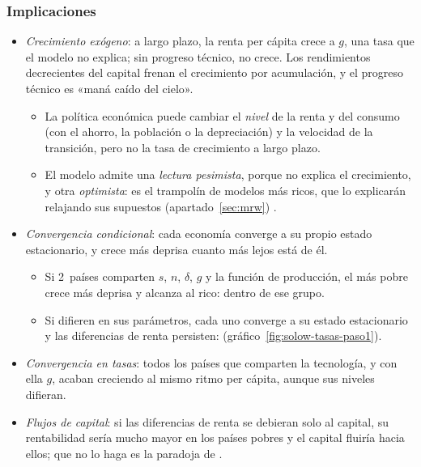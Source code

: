 \documentclass[11pt]{article}
\begin{document}
\subsubsection{Implicaciones}

\begin{itemize}
\item \emph{Crecimiento exógeno}: a largo plazo, la renta per cápita crece a $g$, una tasa que el modelo no explica; sin progreso técnico, no crece. Los rendimientos decrecientes del capital frenan el crecimiento por acumulación, y el progreso técnico es «maná caído del cielo».
  \begin{itemize}
  \item La política económica puede cambiar el \emph{nivel} de la renta y del consumo (con el ahorro, la población o la depreciación) y la velocidad de la transición, pero no la tasa de crecimiento a largo plazo.
  \item El modelo admite una \emph{lectura pesimista}, porque no explica el crecimiento, y otra \emph{optimista}: es el trampolín de modelos más ricos, que lo explicarán relajando sus supuestos (apartado~\ref{sec:mrw}) .
  \end{itemize}
\item \emph{Convergencia condicional}: cada economía converge a su propio estado estacionario, y crece más deprisa cuanto más lejos está de él.
  \begin{itemize}
  \item Si 2~países comparten $s$, $n$, $\delta$, $g$ y la función de producción, el más pobre crece más deprisa y alcanza al rico:  dentro de ese grupo.
  \item Si difieren en sus parámetros, cada uno converge a su estado estacionario y las diferencias de renta persisten:  (gráfico~\ref{fig:solow-tasas-paso1}).
  \end{itemize}
\item \emph{Convergencia en tasas}: todos los países que comparten la tecnología, y con ella $g$, acaban creciendo al mismo ritmo per cápita, aunque sus niveles difieran.
\item \emph{Flujos de capital}: si las diferencias de renta se debieran solo al capital, su rentabilidad sería mucho mayor en los países pobres y el capital fluiría hacia ellos; que no lo haga es la paradoja de \textcite{Lucas1990Why}.
\end{itemize}


\end{document}
